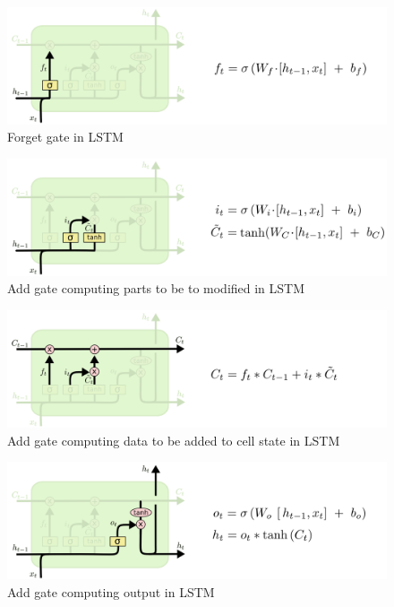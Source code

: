 \documentclass[a4paper]{article}
\begin{document}
\begin{figure}
  \includegraphics[width=.99\linewidth]{img/lstm_forget.png}
  \caption{Forget gate in LSTM}
  \label{fig:lstm_forget}
\end{figure}


\begin{figure}
  \includegraphics[width=.99\linewidth]{img/lstm_add.png}
  \caption{Add gate computing parts to be to modified in LSTM}
  \label{fig:lstm_add}
\end{figure}


\begin{figure}
  \includegraphics[width=.99\linewidth]{img/lstm_add1.png}
  \caption{Add gate computing data to be added to cell state in LSTM}
  \label{fig:lstm_add1}
\end{figure}


\begin{figure}
  \includegraphics[width=.99\linewidth]{img/lstm_output.png}
  \caption{Add gate computing output in LSTM}
  \label{fig:lstm_output}
\end{figure}
\end{document}
